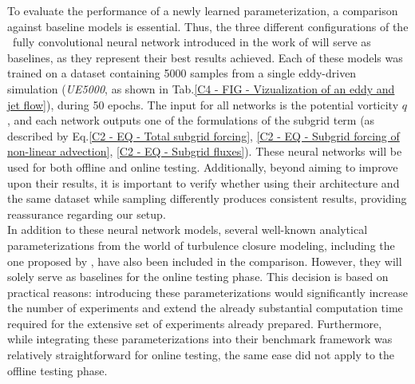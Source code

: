 %
\newpage



\setlength{\parindent}{0pt}

To evaluate the performance of a newly learned parameterization, a comparison against baseline models is essential. Thus, the three different configurations of the ~fully convolutional neural network introduced in the work of \cite{Benchmarking} will serve as baselines, as they represent their best results achieved. Each of these models was trained on a dataset containing 5000 samples from a single eddy-driven simulation (\textit{UE5000}, as shown in Tab.\ref{C4 - FIG - Vizualization of an eddy and jet flow}), during 50 epochs. The input for all networks is the potential vorticity $q$, and each network outputs one of the formulations of the subgrid term (as described by Eq.\ref{C2 - EQ - Total subgrid forcing}, \ref{C2 - EQ - Subgrid forcing of non-linear advection}, \ref{C2 - EQ - Subgrid fluxes}). These neural networks will be used for both offline and online testing. Additionally, beyond aiming to improve upon their results, it is important to verify whether using their architecture and the same dataset while sampling differently produces consistent results, providing reassurance regarding our setup.\\

In addition to these neural network models, several well-known analytical parameterizations from the world of turbulence closure modeling, including the one proposed by \cite{ClosureDataDrivenZanna}, have also been included in the comparison. However, they will solely serve as baselines for the online testing phase. This decision is based on practical reasons: introducing these parameterizations would significantly increase the number of experiments and extend the already substantial computation time required for the extensive set of experiments already prepared. Furthermore, while integrating these parameterizations into their benchmark framework \citep{Benchmarking} was relatively straightforward for online testing, the same ease did not apply to the offline testing phase.\\

